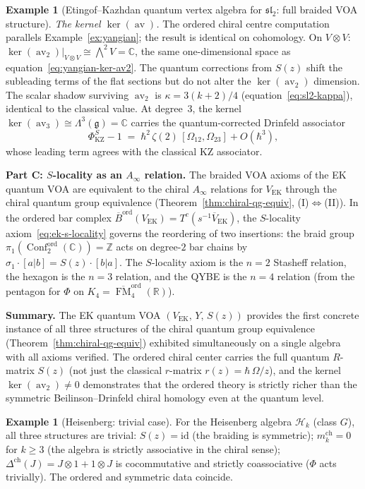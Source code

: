 \documentclass[11pt,reqno]{amsart}
\theoremstyle{definition}
\newtheorem{example}[theorem]{Example}
\theoremstyle{remark}
\newcommand{\cH}{\mathcal{H}}
\newcommand{\Ainf}{A_{\infty}}
\DeclareMathOperator{\Conf}{Conf}
\DeclareMathOperator{\FM}{FM}
\DeclareMathOperator{\av}{av}
\newcommand{\fg}{\mathfrak{g}}
\newcommand{\Barord}{\overline{B}^{\mathrm{ord}}}
\newcommand{\CC}{\mathbb{C}}
\newcommand{\RR}{\mathbb{R}}
\newcommand{\ZZ}{\mathbb{Z}}
\newcommand{\id}{\mathrm{id}}
\numberwithin{equation}{section}
\begin{document}
\begin{example}[Etingof--Kazhdan quantum vertex algebra for
$\mathfrak{sl}_2$: full braided VOA structure]
\emph{The kernel $\ker(\av)$.}
The ordered chiral centre computation parallels
Example~\ref{ex:yangian}; the result is identical on
cohomology. On $V \otimes V$:
$\ker(\av_2)\big|_{V \otimes V}
\cong \bigwedge^2 V = \CC$,
the same one-dimensional space as
equation~\eqref{eq:yangian-ker-av2}.
The quantum corrections from $S(z)$ shift the subleading
terms of the flat sections but do not alter the
$\ker(\av_2)$ dimension. The scalar shadow surviving
$\av_2$ is $\kappa = 3(k+2)/4$ (equation~\eqref{eq:sl2-kappa}),
identical to the classical value. At degree~$3$, the kernel
$\ker(\av_3) \cong \Lambda^3(\fg) = \CC$ carries the
quantum-corrected Drinfeld associator
\begin{equation}\label{eq:ek-ker-av3}
  \Phi_{\mathrm{KZ}}^S - 1
  \;=\; \hbar^2\,\zeta(2)\,[\Omega_{12}, \Omega_{23}]
  + O(\hbar^3),
\end{equation}
whose leading term agrees with the classical KZ associator.

\medskip
\noindent
\textbf{Part C: $S$-locality as an $\Ainf$ relation.}
The braided VOA axioms of the EK quantum VOA are equivalent
to the chiral $\Ainf$ relations for $V_{\mathrm{EK}}$
through the chiral quantum group equivalence
(Theorem~\ref{thm:chiral-qg-equiv},
(I)$\Leftrightarrow$(II)).
In the ordered bar complex
$\Barord(V_{\mathrm{EK}}) = T^c(s^{-1}\overline{V}_{\mathrm{EK}})$,
the $S$-locality axiom~\eqref{eq:ek-s-locality} governs the
reordering of two insertions: the braid group
$\pi_1(\Conf_2^{\mathrm{ord}}(\CC)) = \ZZ$ acts on degree-$2$
bar chains by
$\sigma_1 \cdot [a | b] = S(z) \cdot [b | a]$.
The $S$-locality axiom is the $n = 2$ Stasheff relation,
the hexagon is the $n = 3$ relation, and the QYBE is the
$n = 4$ relation (from the pentagon for $\Phi$ on
$K_4 = \overline{\FM}_4^{\mathrm{ord}}(\RR)$).

\medskip
\noindent
\textbf{Summary.}
\noindent
The EK quantum VOA $(V_{\mathrm{EK}},\, Y,\, S(z))$
provides the first concrete instance of all three structures
of the chiral quantum group equivalence
(Theorem~\ref{thm:chiral-qg-equiv}) exhibited
simultaneously on a single algebra with all axioms verified.
The ordered chiral center carries the full quantum $R$-matrix
$S(z)$ (not just the classical $r$-matrix
$r(z) = \hbar\,\Omega/z$), and the kernel
$\ker(\av_2) \neq 0$ demonstrates that the ordered theory
is strictly richer than the symmetric Beilinson--Drinfeld
chiral homology even at the quantum level.
\end{example}

\begin{example}[Heisenberg: trivial case]
\label{ex:heis-coproduct}
For the Heisenberg algebra $\cH_k$ (class $G$), all three
structures are trivial:
$S(z) = \id$ (the braiding is symmetric);
$m_k^{\mathrm{ch}} = 0$ for $k \geq 3$ (the algebra is
strictly associative in the chiral sense);
$\Delta^{\mathrm{ch}}(J) = J \otimes 1 + 1 \otimes J$ is
cocommutative and strictly coassociative ($\Phi$ acts
trivially). The ordered and symmetric data coincide.
\end{example}
\end{document}

